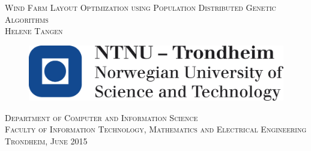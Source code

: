 \begin{titlepage}
 \vspace*{\fill}
    \begin{center}
    {\Huge \scshape \Large Wind Farm Layout Optimization using Population Distributed Genetic Algorithms}\\[0.5cm]
      {      \scshape Helene Tangen }
     \end{center}
	\vspace*{3cm}
    \begin{figure}[h!]
    \centering
    \includegraphics[scale=0.3]{logo_ntnu_eng}
    \end{figure}
    \begin{center}
    \scshape Department of Computer and Information Science \\
    \scshape Faculty of Information Technology, Mathematics and Electrical Engineering\\
  	\normalfont Trondheim, June 2015
    \end{center}
   \vspace*{\fill}

\end{titlepage}

